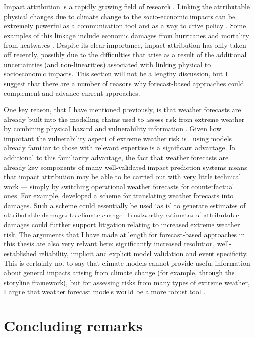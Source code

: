       Impact attribution is a rapidly growing field of research \citep{perkins-kirkpatrick_attribution_2022,burger_law_2020}. Linking the attributable physical changes due to climate change to the socio-economic impacts can be extremely powerful as a communication tool and as a way to drive policy \citep{clarke_inventories_2021}. Some examples of this linkage include economic damages from hurricanes \citep{frame_economic_2020,strauss_economic_2021} and mortality from heatwaves \citep{mitchell_attributing_2016,mitchell_climate_2021,lo_estimating_2022}. Despite its clear importance, impact attribution has only taken off recently, possibly due to the difficulties that arise as a result of the additional uncertainties (and non-linearities) associated with linking physical to socioeconomic impacts. This section will not be a lengthy discussion, but I suggest that there are a number of reasons why forecast-based approaches could complement and advance current approaches.

      One key reason, that I have mentioned previously, is that weather forecasts are already built into the modelling chains used to assess risk from extreme weather by combining physical hazard and vulnerability information \citep{schaller_role_2020}. Given how important the vulnerability aspect of extreme weather risk is \citep{raju_stop_2022,mitchell_increased_2022}, using models already familiar to those with relevant expertise is a significant advantage. In additional to this familiarity advantage, the fact that weather forecasts are already key components of many well-validated impact prediction systems \citep[for example, the GloFAS flood warning system][]{alfieri_glofas_2013} means that impact attribution may be able to be carried out with very little technical work --- simply by switching operational weather forecasts for counterfactual ones. For example, \citet{wilkinson_consequence_2022} developed a scheme for translating weather forecasts into damages. Such a scheme could essentially be used `as is' to generate estimates of attributable damages to climate change. Trustworthy estimates of attributable damages could further support litigation relating to increased extreme weather risk. The arguments that I have made at length for forecast-based approaches in this thesis are also very relvant here: significantly increased resolution, well-established reliability, implicit and explicit model validation and event specificity. This is certainly not to say that climate models cannot provide useful information about general impacts arising from climate change (for example, through the storyline framework), but for assessing risks from many types of extreme weather, I argue that weather forecast models would be a more robust tool \citep{palmer_simple_2018}.

\section{Concluding remarks}\label{discussion:remarks}